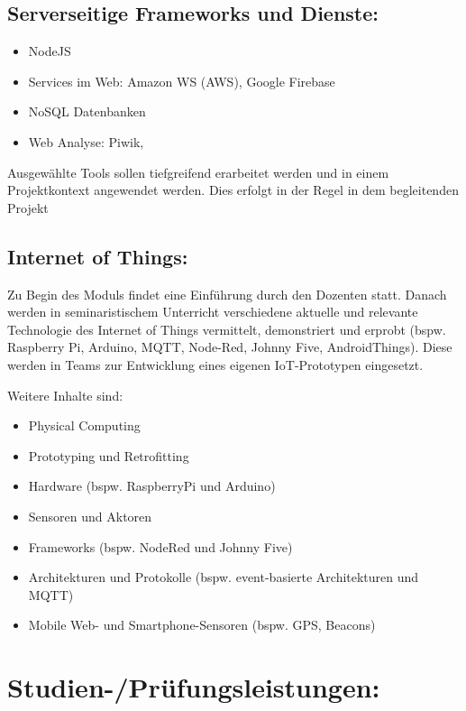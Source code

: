 \subsection*{Serverseitige Frameworks und
Dienste:}\label{serverseitige-frameworks-und-dienste-1}

\begin{itemize}
\tightlist
\item
  NodeJS
\item
  Services im Web: Amazon WS (AWS), Google Firebase
\item
  NoSQL Datenbanken
\item
  Web Analyse: Piwik,
\end{itemize}

Ausgewählte Tools sollen tiefgreifend erarbeitet werden und in einem
Projektkontext angewendet werden. Dies erfolgt in der Regel in dem
begleitenden Projekt

\subsection*{Internet of Things:}\label{internet-of-things-1}

Zu Begin des Moduls findet eine Einführung durch den Dozenten statt.
Danach werden in seminaristischem Unterricht verschiedene aktuelle und
relevante Technologie des Internet of Things vermittelt, demonstriert
und erprobt (bspw. Raspberry Pi, Arduino, MQTT, Node-Red, Johnny Five,
AndroidThings). Diese werden in Teams zur Entwicklung eines eigenen
IoT-Prototypen eingesetzt.

Weitere Inhalte sind:

\begin{itemize}
\tightlist
\item
  Physical Computing
\item
  Prototyping und Retrofitting
\item
  Hardware (bspw. RaspberryPi und Arduino)
\item
  Sensoren und Aktoren
\item
  Frameworks (bspw. NodeRed und Johnny Five)
\item
  Architekturen und Protokolle (bspw. event-basierte Architekturen und
  MQTT)
\item
  Mobile Web- und Smartphone-Sensoren (bspw. GPS, Beacons)
\end{itemize}

\section*{Studien-/Prüfungsleistungen:}\label{studien-pruxfcfungsleistungen-24}

